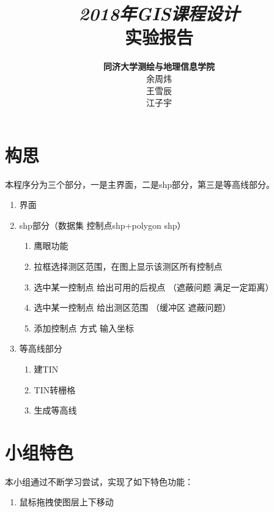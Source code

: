 \documentclass[twoside,color=blue,mathpazo,titlestyle=hang,12pt]{elegantbook}
\title{\Huge\emph{2018年GIS课程设计}\\实验报告}
\author
{
\Large\textbf{同济大学测绘与地理信息学院} \\
余周炜\\
王雪辰\\
江子宇
}
\date{}
\numberwithin{equation}{section}
\begin{document}
\frontmatter

\maketitle


\tableofcontents

\mainmatter

\chapter{构思}

本程序分为三个部分，一是主界面，二是shp部分，第三是等高线部分。

\begin{enumerate}
\item 界面
\item shp部分（数据集 控制点shp+polygon shp）
\begin{enumerate}
\item 鹰眼功能
\item 拉框选择测区范围，在图上显示该测区所有控制点
\item 选中某一控制点 给出可用的后视点 （遮蔽问题 满足一定距离）
\item 选中某一控制点 给出测区范围     （缓冲区 遮蔽问题）
\item 添加控制点 方式 输入坐标
\end{enumerate}
\item 等高线部分
\begin{enumerate}
\item 建TIN
\item TIN转栅格
\item 生成等高线
\end{enumerate}
\end{enumerate}
   

\chapter{小组特色}

本小组通过不断学习尝试，实现了如下特色功能：
\begin{enumerate}
\item 鼠标拖拽使图层上下移动
\end{enumerate}

% 
% 
\end{document}

